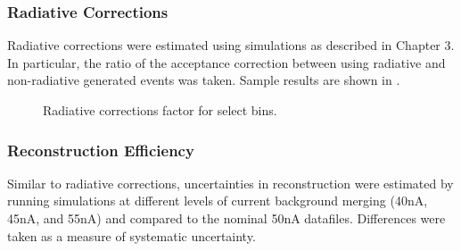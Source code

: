     \subsubsection*{Radiative Corrections}

    Radiative corrections were estimated using simulations as described in Chapter 3. In particular, the ratio of the acceptance correction between using radiative and non-radiative generated events was taken. Sample results are shown in . 
    
    \begin{figure}[H]
    \centering

    \hfill

    \caption[Sample of Radiative Corrections ]{Radiative corrections factor for select bins.}\label{fig:radcorr}
\end{figure}

    \subsubsection*{Reconstruction Efficiency}

    Similar to radiative corrections, uncertainties in reconstruction were estimated by running simulations at different levels of current background merging (40nA, 45nA, and 55nA) and compared to the nominal 50nA datafiles. Differences were taken as a measure of systematic uncertainty. 


